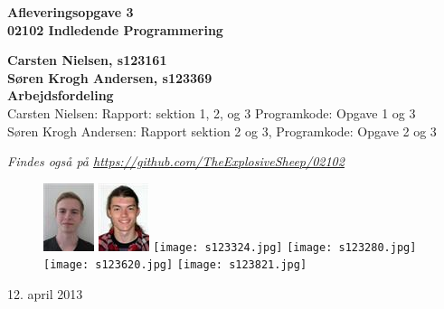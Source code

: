 \thispagestyle{empty} %
\begin{center}
\textbf{\Huge {Afleveringsopgave 3}\\ \vspace{1cm}
\huge{02102 Indledende Programmering}}
\end{center}
\vspace{1cm}
\begin{center}
\Large{\textbf{Carsten Nielsen, s123161 \\ Søren Krogh Andersen, s123369}} \\
\vspace{1cm}
\Large{\textbf{Arbejdsfordeling}} \\
Carsten Nielsen: Rapport: sektion 1, 2, og 3 Programkode: Opgave 1 og 3 \\
Søren Krogh Andersen: Rapport sektion 2 og 3, Programkode: Opgave 2 og 3

\emph{Findes også på \url{https://github.com/TheExplosiveSheep/02102}}
\end{center}
\vspace{6cm}
\begin{figure}[h]
\hfill
\includegraphics{s123161.png}%
\includegraphics{s123369.png}%
\texttt{[image: s123324.jpg]}%
\texttt{[image: s123280.jpg]}%
\texttt{[image: s123620.jpg]}%
\texttt{[image: s123821.jpg]}%
\end{figure}
12. april 2013

\thispagestyle{empty}
\newpage
